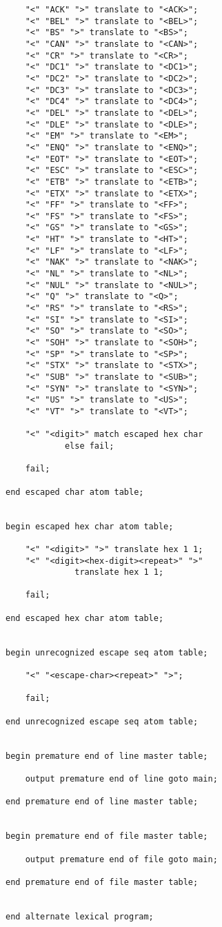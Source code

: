 \documentclass[12pt]{article}
\newenvironment{indpar}[1][0.3in]%
	{\begin{list}{}%
		     {\setlength{\itemsep}{0in}%
		      \setlength{\topsep}{0in}%
		      \setlength{\parsep}{1ex}%
		      \setlength{\labelwidth}{#1}%
		      \setlength{\leftmargin}{#1}%
		      \addtolength{\leftmargin}{\labelsep}}%
	 \item}%
	{\end{list}}
\begin{document}
\begin{indpar}
\begin{verbatim}
    "<" "ACK" ">" translate to "<ACK>";
    "<" "BEL" ">" translate to "<BEL>";
    "<" "BS" ">" translate to "<BS>";
    "<" "CAN" ">" translate to "<CAN>";
    "<" "CR" ">" translate to "<CR>";
    "<" "DC1" ">" translate to "<DC1>";
    "<" "DC2" ">" translate to "<DC2>";
    "<" "DC3" ">" translate to "<DC3>";
    "<" "DC4" ">" translate to "<DC4>";
    "<" "DEL" ">" translate to "<DEL>";
    "<" "DLE" ">" translate to "<DLE>";
    "<" "EM" ">" translate to "<EM>";
    "<" "ENQ" ">" translate to "<ENQ>";
    "<" "EOT" ">" translate to "<EOT>";
    "<" "ESC" ">" translate to "<ESC>";
    "<" "ETB" ">" translate to "<ETB>";
    "<" "ETX" ">" translate to "<ETX>";
    "<" "FF" ">" translate to "<FF>";
    "<" "FS" ">" translate to "<FS>";
    "<" "GS" ">" translate to "<GS>";
    "<" "HT" ">" translate to "<HT>";
    "<" "LF" ">" translate to "<LF>";
    "<" "NAK" ">" translate to "<NAK>";
    "<" "NL" ">" translate to "<NL>";
    "<" "NUL" ">" translate to "<NUL>";
    "<" "Q" ">" translate to "<Q>";
    "<" "RS" ">" translate to "<RS>";
    "<" "SI" ">" translate to "<SI>";
    "<" "SO" ">" translate to "<SO>";
    "<" "SOH" ">" translate to "<SOH>";
    "<" "SP" ">" translate to "<SP>";
    "<" "STX" ">" translate to "<STX>";
    "<" "SUB" ">" translate to "<SUB>";
    "<" "SYN" ">" translate to "<SYN>";
    "<" "US" ">" translate to "<US>";
    "<" "VT" ">" translate to "<VT>";

    "<" "<digit>" match escaped hex char
            else fail;

    fail;

end escaped char atom table;


begin escaped hex char atom table;

    "<" "<digit>" ">" translate hex 1 1;
    "<" "<digit><hex-digit><repeat>" ">"
              translate hex 1 1;

    fail;

end escaped hex char atom table;


begin unrecognized escape seq atom table;

    "<" "<escape-char><repeat>" ">";

    fail;

end unrecognized escape seq atom table;


begin premature end of line master table;

    output premature end of line goto main;

end premature end of line master table;


begin premature end of file master table;

    output premature end of file goto main;

end premature end of file master table;


end alternate lexical program;
\end{verbatim}
\end{indpar}
\end{document}
